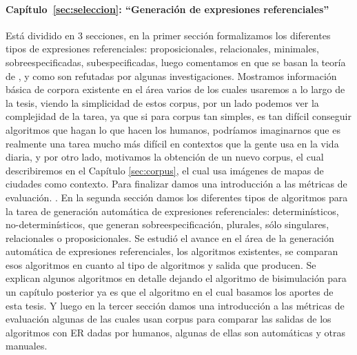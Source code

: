 \paragraph{Cap\'itulo~\ref{sec:seleccion}: ``Generaci\'on de expresiones referenciales''} Est\'a dividido en 3 secciones, en la primer secci\'on formalizamos los diferentes tipos de expresiones referenciales: proposicionales, relacionales, minimales, sobreespecificadas, subespecificadas, luego comentamos en que se basan la teor\'ia de \cite{clark1992arenas}, \cite{Clark-Marshall81} y como son refutadas por algunas investigaciones. Mostramos informaci\'on b\'asica de corpora existente en el \'area varios de los cuales usaremos a lo largo de la tesis, viendo la simplicidad de estos corpus, por un lado podemos ver la complejidad de la tarea, ya que si para corpus tan simples, es tan dif\'icil conseguir algoritmos que hagan lo que hacen los humanos, podr\'iamos imaginarnos que es realmente una tarea mucho m\'as dif\'icil en contextos que la gente usa en la vida diaria, y por otro lado, motivamos la obtenci\'on de un nuevo  corpus, el cual describiremos en el Cap\'itulo \ref{sec:corpus}, el cual usa im\'agenes de mapas de ciudades como contexto. Para finalizar damos una introducci\'on a las m\'etricas de evaluaci\'on. . En la segunda secci\'on damos los diferentes tipos de algoritmos para la tarea de generaci\'on autom\'atica de expresiones referenciales: determin\'isticos, no-determin\'isticos, que generan sobreespecificaci\'on, plurales, s\'olo singulares, relacionales o proposicionales. Se estudi\'o el avance en el \'area de la generaci\'on autom\'atica de expresiones referenciales, los algoritmos existentes, se comparan esos algoritmos en cuanto al tipo de algoritmos y salida que producen. Se explican algunos algoritmos en detalle dejando el algoritmo de bisimulaci\'on para un cap\'itulo posterior ya es que el algoritmo en el cual basamos los aportes de esta tesis. Y luego en la tercer secci\'on damos una introducci\'on a las m\'etricas de evaluaci\'on algunas de las cuales usan corpus para comparar las salidas de los algoritmos con ER dadas por humanos, algunas de ellas son autom\'aticas y otras manuales. 



